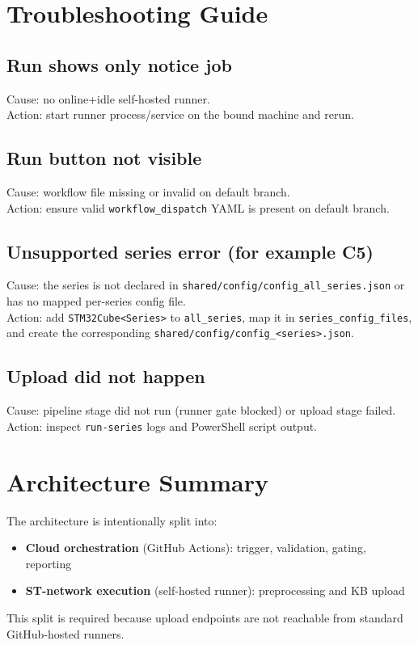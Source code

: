 \documentclass[11pt,a4paper]{article}
\begin{document}
\section{Troubleshooting Guide}
\subsection{Run shows only notice job}
Cause: no online+idle self-hosted runner.\\
Action: start runner process/service on the bound machine and rerun.

\subsection{Run button not visible}
Cause: workflow file missing or invalid on default branch.\\
Action: ensure valid \texttt{workflow\_dispatch} YAML is present on default branch.

\subsection{Unsupported series error (for example C5)}
Cause: the series is not declared in \texttt{shared/config/config\_all\_series.json}
or has no mapped per-series config file.\\
Action: add \texttt{STM32Cube<Series>} to \texttt{all\_series}, map it in
\texttt{series\_config\_files}, and create the corresponding
\texttt{shared/config/config\_<series>.json}.

\subsection{Upload did not happen}
Cause: pipeline stage did not run (runner gate blocked) or upload stage failed.\\
Action: inspect \texttt{run-series} logs and PowerShell script output.

\section{Architecture Summary}
The architecture is intentionally split into:
\begin{itemize}
  \item \textbf{Cloud orchestration} (GitHub Actions): trigger, validation, gating, reporting
  \item \textbf{ST-network execution} (self-hosted runner): preprocessing and KB upload
\end{itemize}
This split is required because upload endpoints are not reachable from standard GitHub-hosted runners.
\end{document}
